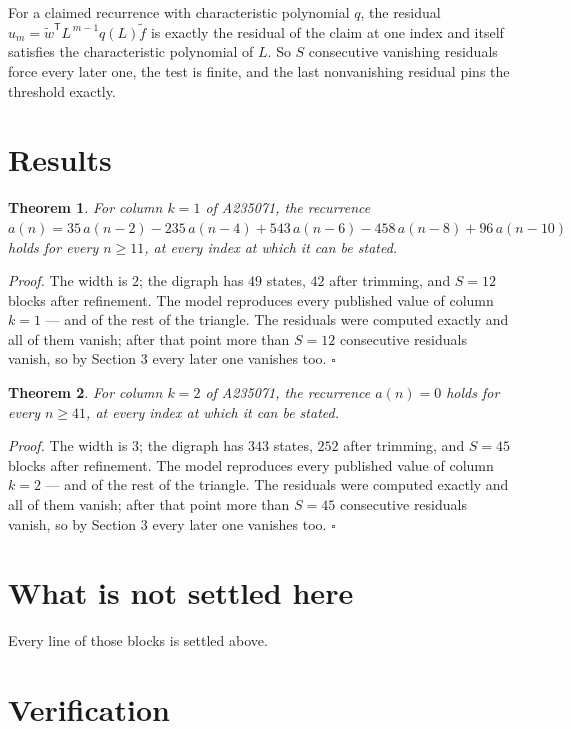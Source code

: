 \documentclass[11pt]{article}
\newtheorem{theorem}{Theorem}
\theoremstyle{definition}
\begin{document}
For a claimed recurrence with characteristic polynomial $q$, the residual $u_m = \tilde w^{\mathsf T}L^{\,m-1}q(L)\tilde f$ is exactly the residual of the claim at one index and itself satisfies the characteristic polynomial of $L$. So $S$ consecutive vanishing residuals force every later one, the test is finite, and the last nonvanishing residual pins the threshold exactly.

\section{Results}

\begin{theorem} For column $k = 1$ of A235071, the recurrence $a(n) = 35\,a(n-2) - 235\,a(n-4) + 543\,a(n-6) - 458\,a(n-8) + 96\,a(n-10)$ holds for every $n \ge 11$, at every index at which it can be stated.\end{theorem}

{\itshape Proof.} The width is $2$; the digraph has $49$ states, $42$ after trimming, and $S = 12$ blocks after refinement. The model reproduces every published value of column $k = 1$ --- and of the rest of the triangle. The residuals were computed exactly and all of them vanish; after that point more than $S = 12$ consecutive residuals vanish, so by Section 3 every later one vanishes too. $\square$

\begin{theorem} For column $k = 2$ of A235071, the recurrence $a(n) = 0$ holds for every $n \ge 41$, at every index at which it can be stated.\end{theorem}

{\itshape Proof.} The width is $3$; the digraph has $343$ states, $252$ after trimming, and $S = 45$ blocks after refinement. The model reproduces every published value of column $k = 2$ --- and of the rest of the triangle. The residuals were computed exactly and all of them vanish; after that point more than $S = 45$ consecutive residuals vanish, so by Section 3 every later one vanishes too. $\square$

\section{What is not settled here}

Every line of those blocks is settled above.

\section{Verification}
\end{document}
